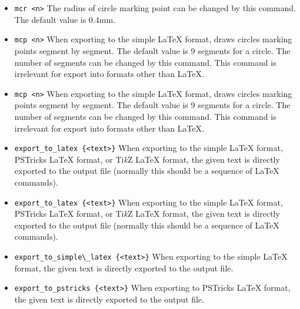 \documentclass[a4paper]{book}
\begin{document}
\begin{itemize}
\item \verb|mcr <n>|
        The radius of circle marking point can be changed by this command.
        The default value is 0.4mm.

\item \verb|mcp <n>|
        When exporting to the simple \LaTeX{} format, draws circles marking points segment
        by segment. The default value is 9 segments for a circle. The
        number of segments can be changed by this command. This command
        is irrelevant for export into formats other than \LaTeX{}.

\item \verb|mcp <n>|
        When exporting to the simple \LaTeX{} format, draws circles marking points segment
        by segment. The default value is 9 segments for a circle. The
        number of segments can be changed by this command. This command
        is irrelevant for export into formats other than \LaTeX{}.

\item \verb|export_to_latex {<text>}|
        When exporting to the simple \LaTeX{} format, PSTricks \LaTeX{} format, or
        Ti{\em k}Z \LaTeX{} format, the given text is directly exported to the output
        file (normally this should be a sequence of \LaTeX{} commands).

\item \verb|export_to_latex {<text>}|
        When exporting to the simple \LaTeX{} format, PSTricks \LaTeX{} format, or
        Ti{\em k}Z \LaTeX{} format, the given text is directly exported to the output
        file (normally this should be a sequence of \LaTeX{} commands).

\item \verb|export_to_simple\_latex {<text>}|
        When exporting to the simple \LaTeX{} format, the given text is directly
        exported to the output file.

\item \verb|export_to_pstricks {<text>}|
        When exporting to PSTricks \LaTeX{} format, the given text is directly
        exported to the output file.


\end{itemize}
\end{document}
